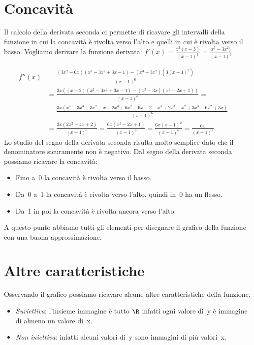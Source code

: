 \section{Concavità}
\label{sec:04_concavita}
Il calcolo della derivata seconda ci permette di ricavare gli intervalli 
della funzione in cui la concavità è rivolta verso l'alto e quelli in cui è 
rivolta verso il basso. Vogliamo derivare la funzione derivata:
\(f'(x)=\frac{x^2(x-3)}{(x-1)^3}=\frac{x^3-3x^2)}{(x-1)^3}\)

\begin{align*}
f''(x) &= \frac{(3x^2 -6x)(x^3-3x^2+3x-1)-(x^3-3x^2)(3(x-1)^2)}{(x-1)^6} =\\
       &= \frac{3x((x -2)(x^3-3x^2+3x-1)-(x^2-3x)(x^2-2x+1))}{(x-1)^6} =\\
       &= \frac{3x(x^4-3x^3+3x^2-x-2x^3+6x^2-6x+2-x^4+2x^3-x^2+3x^3-6x^2+3x)}
               {(x-1)^6} =\\
       &= \frac{3x(2x^2-4x+2)}{(x-1)^6} = \frac{6x(x^2-2x+1)}{(x-1)^6} =
          \frac{6x(x-1)^2}{(x-1)^6} = \frac{6x}{(x-1)^4}
\end{align*}
Lo studio del segno della derivata seconda risulta molto semplice dato che il 
denominatore sicuramente non è negativo. 
Dal segno della derivata seconda possiamo ricavare la concavità:
\begin{center}
 \segnoderivatasecondaa
\end{center}

\begin{itemize} [nosep]
 \item Fino a~0 la concavità è rivolta verso il basso.
 \item Da~0 a~1 la concavità è rivolta verso l'alto, quindi in~0 ha un flesso.
 \item Da~1 in poi la concavità è rivolta ancora verso l'alto.
\end{itemize}

A questo punto abbiamo tutti gli elementi per disegnare il grafico della 
funzione con una buona approssimazione.
\begin{center} \tuttoassiemea \end{center}

\section{Altre caratteristiche}
\label{sec:altre_caratteristche}

% 
Osservando il grafico possiamo ricavare alcune altre caratteristiche della 
funzione.
\begin{itemize} [nosep]
 \item \emph{Suriettiva}: l'insieme immagine è tutto \(\R\) infatti ogni 
valore di~y è immagine di almeno un valore di~x.
 \item \emph{Non iniettiva}: infatti alcuni valori di~y sono immagini di più 
valori~x.
\end{itemize}

